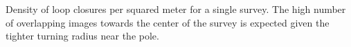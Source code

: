 \label{fig:LCdensity} Density of loop closures per squared meter for a single survey. The high number of overlapping images towards the center of the survey is expected given the tighter turning radius near the pole.